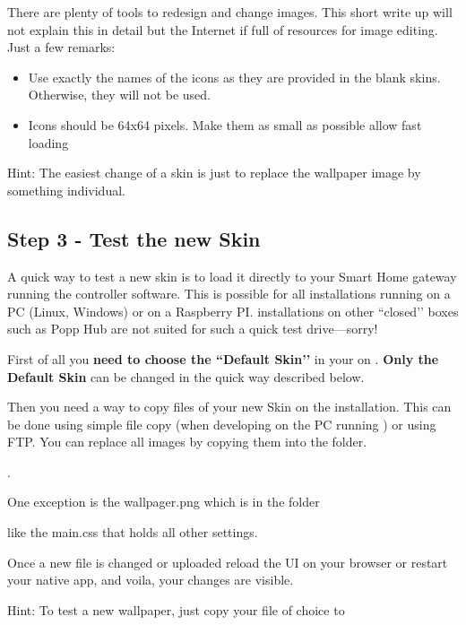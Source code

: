 There are plenty of tools to redesign and change images. This short write up will not 
explain this in detail but the Internet if full of resources for image editing. Just a few remarks:

\begin{itemize}
\item Use exactly the names of the icons as they are provided in the blank skins. Otherwise, they will not be used.
\item Icons should be 64x64 pixels. Make them as small as possible allow fast loading
\end{itemize}

Hint: The easiest change of a skin is just to replace the wallpaper image by something individual.

\subsection{Step 3 - Test the new Skin}

A quick way to test a new skin is to load it directly to your Smart Home gateway running the 
\zway controller software. This is possible for all \zway installations running on a PC 
(Linux, Windows) or on a Raspberry PI. \zway installations on other ``closed’’ boxes such 
as Popp Hub are not suited for such a quick test drive---sorry!

First of all you \textbf{need to choose the ``Default Skin’’} in your \zwshui on
. \textbf{Only the Default Skin} 
can be changed in the quick way described below.

Then you need a way to copy files of your new Skin on the \zway installation. This can 
be done using simple file copy (when developing on the PC running \zway) or using FTP. 
You can replace all images by copying them into the folder.

.

One exception is the wallpager.png which is in the folder



like the main.css that holds all other settings.

Once a new file is changed or uploaded reload the UI on your browser or restart your 
native app, and voila, your changes are visible.

Hint: To test a new wallpaper, just copy your file of choice to



